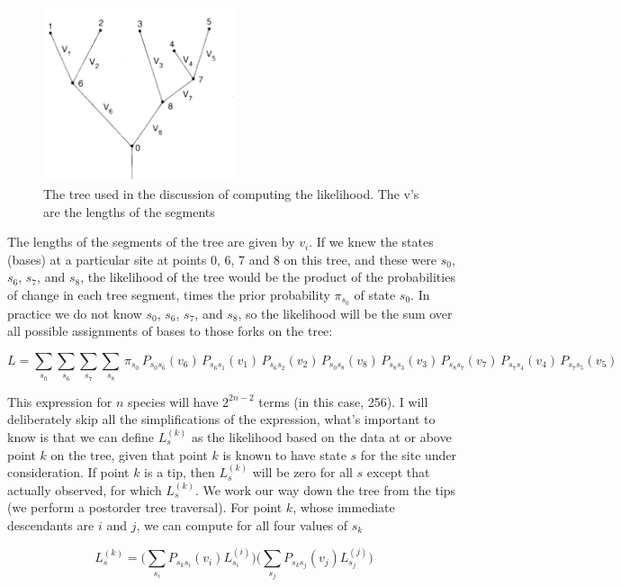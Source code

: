 \begin{figure}[H]
		\centering
		\includegraphics[width=0.5\textwidth]{tree1.png}
		\caption{The tree used in the discussion of computing the likelihood. The v's are the lengths of the segments }
		\label{fig:tree1}
	\end{figure}

The lengths of the segments of the tree are given by $v_i$. If we knew the states (bases) at a particular site at points 0, 6, 7 and 8 on this tree, and these were $s_0$, $s_6$, $s_7$, and $s_8$, the likelihood of the tree would be the product of
the probabilities of change in each tree segment, times the prior probability $\pi_{s_0}$ of state $s_0$. In practice we do not know $s_0$, $s_6$, $s_7$, and $s_8$, so the likelihood will be the sum over all possible assignments of bases to those forks on the tree:

\begin{equation}
L = \sum_{s_0} \sum_{s_6} \sum_{s_7} \sum_{s_8} \, \pi_{s_0} \, P_{s_0 s_6}(v_6) \, P_{s_6 s_1}(v_1) \, P_{s_6 s_2}(v_2) \, P_{s_0 s_8}(v_8) \, P_{s_8 s_3}(v_3) \, P_{s_8 s_7}(v_7) \, P_{s_7 s_4}(v_4) \, P_{s_7 s_5}(v_5)
\end{equation}

This expression for $n$ species will have $2^{2n -2}$ terms (in this case, 256).
I will deliberately skip all the simplifications of the expression, what's important to know is that we can define $L_s^{(k)}$ as the likelihood based on the data at or above point $k$ on the tree, given that point $k$ is known to have state $s$ for the site under consideration. If point $k$ is a tip, then  $L_s^{(k)}$ will be zero for all $s$ except that actually observed, for which  $L_s^{(k)}$.
We work our way down the tree from the tips (we perform a postorder tree traversal). For point $k$, whose immediate descendants are $i$ and $j$, we can compute for all four values of $s_k$

\begin{equation}
L_s^{(k)} = \big( \sum_{s_i} P_{s_k s_i}(v_i) L_{s_i} ^{(i)} ) (\sum_{s_j} P_{s_k s_j}(v_j) L_{s_j} ^{(j)} \big)
\end{equation}

